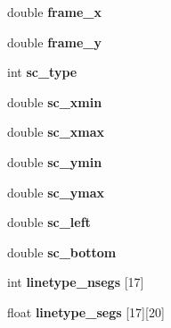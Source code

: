 \begin{Indent}{\bf }\par
{\em \label{_amgrpd41d8cd98f00b204e9800998ecf8427e}
 }\begin{DoxyCompactItemize}
\item 
double {\bf frame\_\-x}
\item 
double {\bfseries frame\_\-y}\label{structhpgs__reader__st_ac2f19dbd790611b87ec699f6eaa9b204}

\end{DoxyCompactItemize}
\end{Indent}
\begin{Indent}{\bf }\par
{\em \label{_amgrpd41d8cd98f00b204e9800998ecf8427e}
 }\begin{DoxyCompactItemize}
\item 
int {\bf sc\_\-type}
\item 
double {\bfseries sc\_\-xmin}\label{structhpgs__reader__st_a5a40f76e90895fc2b756a89c8f62714d}

\item 
double {\bfseries sc\_\-xmax}\label{structhpgs__reader__st_a9ae55a23410d686c96bb465f8aa80f7a}

\item 
double {\bfseries sc\_\-ymin}\label{structhpgs__reader__st_acbf694476f0996aab26245dc6a4dcd24}

\item 
double {\bfseries sc\_\-ymax}\label{structhpgs__reader__st_a250631be90f5274ff935119a93aaccbb}

\item 
double {\bfseries sc\_\-left}\label{structhpgs__reader__st_af245a6e2a76afe8085d30eea8499217b}

\item 
double {\bfseries sc\_\-bottom}\label{structhpgs__reader__st_a462644489e395b43ca0c37e8bdb3a392}

\end{DoxyCompactItemize}
\end{Indent}
\begin{Indent}{\bf }\par
{\em \label{_amgrpd41d8cd98f00b204e9800998ecf8427e}
 }\begin{DoxyCompactItemize}
\item 
int {\bf linetype\_\-nsegs} [17]
\item 
float {\bfseries linetype\_\-segs} [17][20]\label{structhpgs__reader__st_ad772d590b70c7411001cbb255f3e6db4}

\end{DoxyCompactItemize}
\end{Indent}
